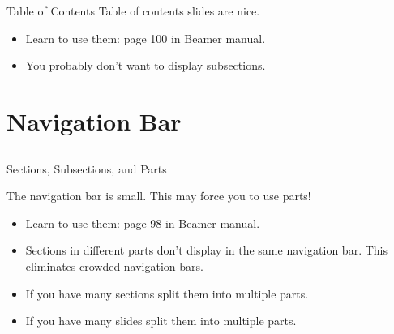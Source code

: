 \documentclass[serif]{beamer}
\begin{document}
\begin{frame}{Table of Contents}
Table of contents slides are nice.
\begin{itemize}
\item Learn to use them: page 100 in Beamer manual.
\item You probably don't want to display subsections.
\end{itemize}

\end{frame}

\tableofcontents[currentsection,subsectionstyle=hide]


\section{Navigation Bar}
\subsection{}

\begin{frame}{Sections, Subsections, and Parts}

The navigation bar is small. This may force you to use parts!
\begin{itemize}
\item Learn to use them: page 98 in Beamer manual.
\item Sections in different parts don't display in the same navigation bar. This eliminates crowded navigation bars.
\item If you have many sections split them into multiple parts.
\item If you have many slides split them into multiple parts.
\end{itemize}

\end{frame}
\end{document}
